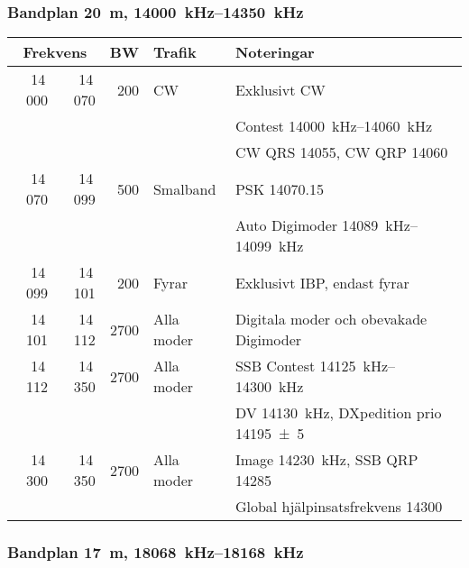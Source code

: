 \subsubsection{Bandplan \qty{20}{\metre}, \SIrange{14000}{14350}{\kilo\hertz}}
\begin{tabular}{rrrll}
\multicolumn{2}{c}{\textbf{Frekvens}} & \textbf{BW} & \textbf{Trafik}
        & \textbf{Noteringar} \\ \hline

14\,000 & 14\,070 & 200  & CW         & Exklusivt CW                                        \\
        &         &      &            & Contest \SIrange{14000}{14060}{\kilo\hertz}                 \\
        &         &      &            & CW QRS \num{14055}, CW QRP \num{14060}              \\ \hline
14\,070 & 14\,099 & 500  & Smalband   & PSK \num{14070,15}                                  \\
        &         &      &            & Auto Digimoder \SIrange{14089}{14099}{\kilo\hertz}          \\ \hline
14\,099 & 14\,101 & 200  & Fyrar      & Exklusivt IBP, endast fyrar                         \\ \hline
14\,101 & 14\,112 & 2700 & Alla moder & Digitala moder och obevakade Digimoder              \\ \hline
14\,112 & 14\,350 & 2700 & Alla moder & SSB Contest \SIrange{14125}{14300}{\kilo\hertz}             \\
        &         &      &            & DV \qty{14130}{\kilo\hertz}, DXpedition prio \qty{14195(5)}{} \\ \hline
14\,300 & 14\,350 & 2700 & Alla moder & Image \qty{14230}{\kilo\hertz}, SSB QRP \num{14285}          \\
        &         &      &            & Global hjälpinsatsfrekvens \num{14300}              \\ \hline
\end{tabular}

\subsubsection{Bandplan \qty{17}{\metre}, \SIrange{18068}{18168}{\kilo\hertz}}

